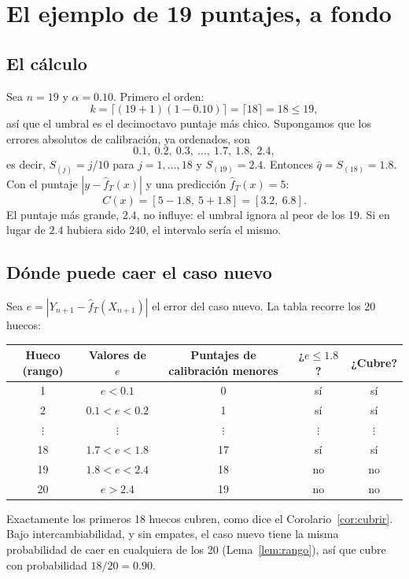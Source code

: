 \documentclass[11pt]{article}
\theoremstyle{plain}
\theoremstyle{definition}
\theoremstyle{remark}
\newcommand{\qhat}{\widehat q}
\newcommand{\fhat}{\widehat f_T}
\newcommand{\lamina}[1]{}%
\begin{document}
\section{El ejemplo de 19 puntajes, a fondo}\label{sec:ej19}\lamina{15}
\subsection{El cálculo}
Sea $n=19$ y $\alpha=0.10$. Primero el orden:
\[
 k=\lceil(19+1)(1-0.10)\rceil=\lceil18\rceil=18\le19,
\]
así que el umbral es el decimoctavo puntaje más chico. Supongamos que los errores absolutos de
calibración, ya ordenados, son
\[
 0.1,\ 0.2,\ 0.3,\ \dots,\ 1.7,\ 1.8,\ 2.4,
\]
es decir, $S_{(j)}=j/10$ para $j=1,\dots,18$ y $S_{(19)}=2.4$. Entonces $\qhat=S_{(18)}=1.8$. Con el
puntaje $|y-\fhat(x)|$ y una predicción $\fhat(x)=5$:
\[
 C(x)=[5-1.8,\ 5+1.8]=[3.2,\ 6.8].
\]
El puntaje más grande, $2.4$, no influye: el umbral ignora al peor de los 19. Si en lugar de $2.4$
hubiera sido $240$, el intervalo sería el mismo.

\subsection{Dónde puede caer el caso nuevo}
Sea $e=|Y_{n+1}-\fhat(X_{n+1})|$ el error del caso nuevo. La tabla recorre los 20 huecos:
\begin{center}
\renewcommand{\arraystretch}{1.25}
\begin{tabular}{ccccc}
\toprule
Hueco (rango) & Valores de $e$ & Puntajes de calibración menores & ¿$e\le1.8$? & ¿Cubre?\\
\midrule
1 & $e<0.1$ & 0 & sí & sí\\
2 & $0.1<e<0.2$ & 1 & sí & sí\\
$\vdots$ & $\vdots$ & $\vdots$ & $\vdots$ & $\vdots$\\
18 & $1.7<e<1.8$ & 17 & sí & sí\\
19 & $1.8<e<2.4$ & 18 & no & no\\
20 & $e>2.4$ & 19 & no & no\\
\bottomrule
\end{tabular}
\end{center}
Exactamente los primeros 18 huecos cubren, como dice el Corolario~\ref{cor:cubrir}. Bajo
intercambiabilidad, y sin empates, el caso nuevo tiene la misma probabilidad de caer en cualquiera de
los 20 (Lema~\ref{lem:rango}), así que cubre con probabilidad $18/20=0.90$.
\end{document}
